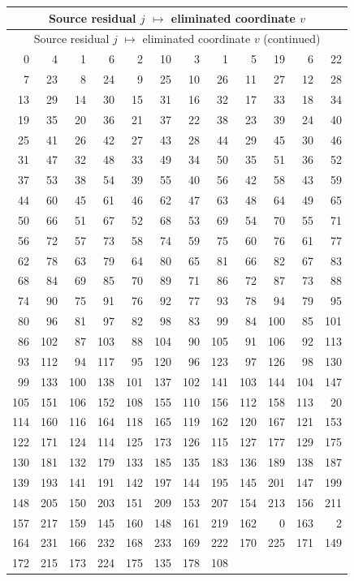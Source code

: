 \documentclass[11pt,letterpaper]{article}
\theoremstyle{definition}
\theoremstyle{remark}
\begin{document}
\begin{longtable}{*{6}{r@{\,$\mapsto$\,}r}}
\hline
\multicolumn{12}{c}{Source residual $j$ $\mapsto$ eliminated coordinate $v$}\\
\hline
\endfirsthead
\hline
\multicolumn{12}{c}{Source residual $j$ $\mapsto$ eliminated coordinate $v$ (continued)}\\
\hline
\endhead
0 & 4 & 1 & 6 & 2 & 10 & 3 & 1 & 5 & 19 & 6 & 22 \\
7 & 23 & 8 & 24 & 9 & 25 & 10 & 26 & 11 & 27 & 12 & 28 \\
13 & 29 & 14 & 30 & 15 & 31 & 16 & 32 & 17 & 33 & 18 & 34 \\
19 & 35 & 20 & 36 & 21 & 37 & 22 & 38 & 23 & 39 & 24 & 40 \\
25 & 41 & 26 & 42 & 27 & 43 & 28 & 44 & 29 & 45 & 30 & 46 \\
31 & 47 & 32 & 48 & 33 & 49 & 34 & 50 & 35 & 51 & 36 & 52 \\
37 & 53 & 38 & 54 & 39 & 55 & 40 & 56 & 42 & 58 & 43 & 59 \\
44 & 60 & 45 & 61 & 46 & 62 & 47 & 63 & 48 & 64 & 49 & 65 \\
50 & 66 & 51 & 67 & 52 & 68 & 53 & 69 & 54 & 70 & 55 & 71 \\
56 & 72 & 57 & 73 & 58 & 74 & 59 & 75 & 60 & 76 & 61 & 77 \\
62 & 78 & 63 & 79 & 64 & 80 & 65 & 81 & 66 & 82 & 67 & 83 \\
68 & 84 & 69 & 85 & 70 & 89 & 71 & 86 & 72 & 87 & 73 & 88 \\
74 & 90 & 75 & 91 & 76 & 92 & 77 & 93 & 78 & 94 & 79 & 95 \\
80 & 96 & 81 & 97 & 82 & 98 & 83 & 99 & 84 & 100 & 85 & 101 \\
86 & 102 & 87 & 103 & 88 & 104 & 90 & 105 & 91 & 106 & 92 & 113 \\
93 & 112 & 94 & 117 & 95 & 120 & 96 & 123 & 97 & 126 & 98 & 130 \\
99 & 133 & 100 & 138 & 101 & 137 & 102 & 141 & 103 & 144 & 104 & 147 \\
105 & 151 & 106 & 152 & 108 & 155 & 110 & 156 & 112 & 158 & 113 & 20 \\
114 & 160 & 116 & 164 & 118 & 165 & 119 & 162 & 120 & 167 & 121 & 153 \\
122 & 171 & 124 & 114 & 125 & 173 & 126 & 115 & 127 & 177 & 129 & 175 \\
130 & 181 & 132 & 179 & 133 & 185 & 135 & 183 & 136 & 189 & 138 & 187 \\
139 & 193 & 141 & 191 & 142 & 197 & 144 & 195 & 145 & 201 & 147 & 199 \\
148 & 205 & 150 & 203 & 151 & 209 & 153 & 207 & 154 & 213 & 156 & 211 \\
157 & 217 & 159 & 145 & 160 & 148 & 161 & 219 & 162 & 0 & 163 & 2 \\
164 & 231 & 166 & 232 & 168 & 233 & 169 & 222 & 170 & 225 & 171 & 149 \\
172 & 215 & 173 & 224 & 175 & 135 & 178 & 108 & \multicolumn{2}{c}{} & \multicolumn{2}{c}{} \\
\hline
\end{longtable}
\endgroup
\end{document}
